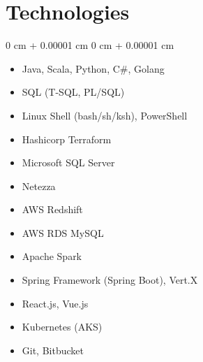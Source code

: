 \documentclass[10pt, letterpaper]{article}
\newenvironment{highlightsforbulletentries}{
    \begin{itemize}[
        topsep=0.10 cm,
        parsep=0.10 cm,
        partopsep=0pt,
        itemsep=0pt,
        leftmargin=10pt
    ]
}{
    \end{itemize}
} %
\newenvironment{onecolentry}{
    \begin{adjustwidth}{
        0 cm + 0.00001 cm
    }{
        0 cm + 0.00001 cm
    }
}{
    \end{adjustwidth}
} %
\newenvironment{threecolentry}[3][]{
    \onecolentry
    \def\thirdColumn{#3}
    \setcolumnwidth{, \fill, 4.5 cm}
    \begin{paracol}{3}
    {\raggedright #2} \switchcolumn
}{
    \switchcolumn \raggedleft \thirdColumn
    \end{paracol}
    \endonecolentry
} %
\begin{document}
%
%
%
%
%
%
%
%

        \section{Technologies}

        \begin{threecolentry}{
            \begin{itemize}
                \item Java, Scala, Python, C\#, Golang
                \item SQL (T-SQL, PL/SQL)
                \item Linux Shell (bash/sh/ksh), PowerShell
                \item Hashicorp Terraform
            \end{itemize}
        }{ %
            \begin{itemize}
                \item Spring Framework (Spring Boot), Vert.X
                \item React.js, Vue.js
                \item Kubernetes (AKS)
                \item Git, Bitbucket
            \end{itemize}
        } 

        \begin{itemize}
            \item Microsoft SQL Server
            \item Netezza
            \item AWS Redshift
            \item AWS RDS MySQL
            \item Apache Spark
        \end{itemize}
        \end{threecolentry}
        
\end{document}
